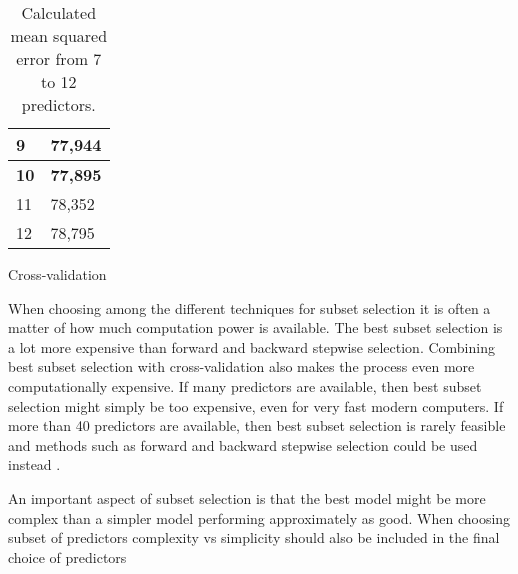 \begin{table}
\begin{subtable}[t]{2in}
\begin{tabular}{ p{2.5cm} p{1.5cm}  }
		9 & \vspace{0.03em} 77,944  \\\hline
		\vspace{0.03em}
		\textbf{10} & \vspace{0.03em} \textbf{77,895} \\\hline
		\vspace{0.03em}
		11 & \vspace{0.03em} 78,352  \\\hline
		\vspace{0.03em}
		12 & \vspace{0.03em} 78,795 \\\hline
	\end{tabular}
		\caption{Cross-validation}\label{table:mse_cross}
	\end{subtable}
	\caption{Calculated mean squared error from 7 to 12 predictors.}\label{table:mse}
\end{table}

When choosing among the different techniques for subset selection it is often a matter of how much computation power is available.  The best subset selection is a lot more expensive than forward and backward stepwise selection. Combining best subset selection with cross-validation also makes the process even more computationally expensive. If many predictors are available, then best subset selection might simply be too expensive, even for very fast modern computers. If more than 40 predictors are available, then best subset selection is rarely feasible and methods such as forward and backward stepwise selection could be used instead  \citep[pp. 207]{ISLR}. 

An important aspect of subset selection is that the best model might be more complex than a simpler model performing approximately as good. When choosing subset of predictors complexity vs simplicity should also be included in the final choice of predictors